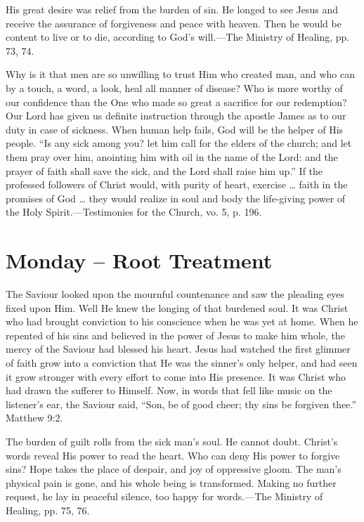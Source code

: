 \documentclass[a4paper, 10pt, twoside, headings=small]{scrartcl}
\begin{document}
\begin{multicols}{2}
His great desire was relief from the burden of sin. He longed to see Jesus and receive the assurance of forgiveness and peace with heaven. Then he would be content to live or to die, according to God’s will.—The Ministry of Healing, pp. 73, 74.

Why is it that men are so unwilling to trust Him who created man, and who can by a touch, a word, a look, heal all manner of disease? Who is more worthy of our confidence than the One who made so great a sacrifice for our redemption? Our Lord has given us definite instruction through the apostle James as to our duty in case of sickness. When human help fails, God will be the helper of His people. “Is any sick among you? let him call for the elders of the church; and let them pray over him, anointing him with oil in the name of the Lord: and the prayer of faith shall save the sick, and the Lord shall raise him up.” If the professed followers of Christ would, with purity of heart, exercise … faith in the promises of God … they would realize in soul and body the life-giving power of the Holy Spirit.—Testimonies for the Church, vo. 5, p. 196.

\section*{Monday – Root Treatment}

The Saviour looked upon the mournful countenance and saw the pleading eyes fixed upon Him. Well He knew the longing of that burdened soul. It was Christ who had brought conviction to his conscience when he was yet at home. When he repented of his sins and believed in the power of Jesus to make him whole, the mercy of the Saviour had blessed his heart. Jesus had watched the first glimmer of faith grow into a conviction that He was the sinner’s only helper, and had seen it grow stronger with every effort to come into His presence. It was Christ who had drawn the sufferer to Himself. Now, in words that fell like music on the listener’s ear, the Saviour said, “Son, be of good cheer; thy sins be forgiven thee.” Matthew 9:2.

The burden of guilt rolls from the sick man’s soul. He cannot doubt. Christ’s words reveal His power to read the heart. Who can deny His power to forgive sins? Hope takes the place of despair, and joy of oppressive gloom. The man’s physical pain is gone, and his whole being is transformed. Making no further request, he lay in peaceful silence, too happy for words.—The Ministry of Healing, pp. 75, 76.


\end{multicols}
\end{document}
